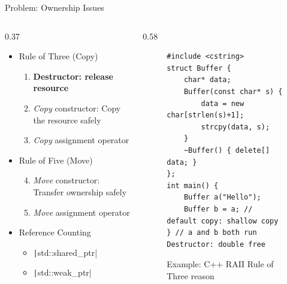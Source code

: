 \begin{frame}[fragile]{Problem: Ownership Issues}
	\begin{columns}[T,onlytextwidth]
		\begin{column}{0.37\textwidth}
			\begin{itemize}
				\item Rule of Three (Copy)
				      \begin{enumerate}
					      \item \textbf{Destructor: release resource}
					      \item \textit{Copy} constructor: Copy the resource safely
					      \item \textit{Copy} assignment operator
				      \end{enumerate}
				\item Rule of Five (Move)
				      \begin{enumerate}\setcounter{enumi}{3}
					      \item \textit{Move} constructor: Transfer ownership safely
					      \item \textit{Move} assignment operator
				      \end{enumerate}
				\item Reference Counting
				      \begin{itemize}
					      \item \texttt|std::shared_ptr|
					      \item \texttt|std::weak_ptr|
				      \end{itemize}
			\end{itemize}
		\end{column}
		\begin{column}{0.58\textwidth}
			\begin{figure}
				\centering
				\begin{verbatim}
#include <cstring>
struct Buffer {
    char* data;
    Buffer(const char* s) {
        data = new char[strlen(s)+1];
        strcpy(data, s);
    }
    ~Buffer() { delete[] data; }
};
int main() {
    Buffer a("Hello");
    Buffer b = a; // default copy: shallow copy
} // a and b both run Destructor: double free
                \end{verbatim}
				\caption{Example: C++ RAII Rule of Three reason}
			\end{figure}
		\end{column}
	\end{columns}
	\vspace{-1cm}
\end{frame}

